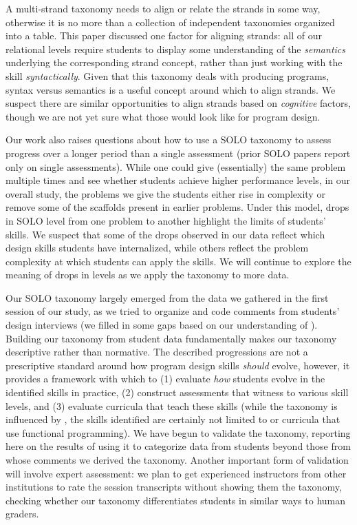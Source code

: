 A multi-strand taxonomy needs to align or relate the strands in some
way, otherwise it is no more than a collection of independent
taxonomies organized into a table.  This paper discussed one factor
for aligning strands: all of our relational levels require students to
display some understanding of the \emph{semantics} underlying the
corresponding strand concept, rather than just working with the skill
\emph{syntactically}.  Given that this taxonomy deals with producing
programs, syntax versus semantics is a useful concept around which to
align strands.  We suspect there are similar opportunities to align
strands based on \emph{cognitive} factors, though we are not yet sure
what those would look like for program design.

Our work also raises questions about how to use a SOLO taxonomy to
assess progress over a longer period than a single assessment (prior
SOLO papers report only on single assessments).  While one could give
(essentially) the same problem multiple times and see whether students
achieve higher performance levels, in our overall study, the problems
we give the students either rise in complexity or remove some of the
scaffolds present in earlier problems. Under this model, drops in
SOLO level from one problem to another highlight the limits of
students' skills.  We suspect that some of the drops observed in our
data reflect which design skills students have internalized, while
others reflect the problem complexity at which students can apply the
skills.  We will continue to explore the meaning of drops in levels as
we apply the taxonomy to more data.

Our SOLO taxonomy largely emerged from the data we gathered in the
first session of our study, as we tried to organize and code
comments from students' design interviews (we
filled in some gaps based on our understanding of \htdp).
Building our taxonomy from student data fundamentally makes our
taxonomy descriptive rather than normative. The described progressions are
not a prescriptive standard around how program design skills \emph{should}
evolve, however, it provides a framework with which to (1) evaluate
\emph{how} students evolve in the identified skills in practice, (2)
construct assessments that witness to various skill levels, and (3) evaluate
curricula that teach these skills (while the taxonomy is influenced by \htdp,
the skills identified are certainly not limited to \htdp or curricula that
use functional programming).
We have begun to validate the taxonomy, reporting here on the results of
using it to categorize data from students beyond those from whose comments we
derived the taxonomy.  Another important form of validation will involve
expert assessment: we plan to get experienced \htdp instructors from other
institutions to rate the session transcripts without showing them the
taxonomy, checking whether our taxonomy differentiates students in similar
ways to human graders.

